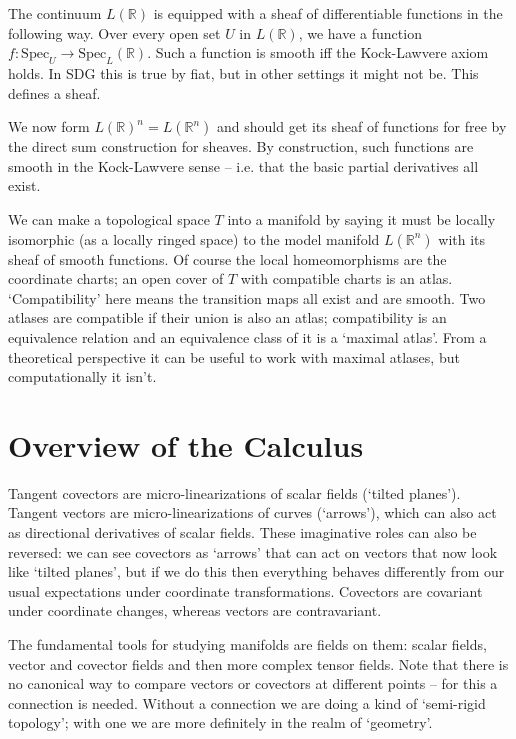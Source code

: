 \documentclass[oneside,english]{amsbook}
\numberwithin{section}{chapter}
\theoremstyle{plain}
\theoremstyle{definition}
\begin{document}
The continuum $L(\mathbb{R})$ is equipped with a sheaf of differentiable functions in the following way. Over every open set $U$ in $L(\mathbb{R})$, we have a function $f:\text{Spec}_U\to \text{Spec}_L(\mathbb{R})$. Such a function is smooth iff the Kock-Lawvere axiom holds. In SDG this is true by fiat, but in other settings it might not be. This defines a sheaf.

We now form $L(\mathbb{R})^n = L(\mathbb{R}^n)$ and should get its sheaf of functions for free by the direct sum construction for sheaves. By construction, such functions are smooth in the Kock-Lawvere sense -- i.e. that the basic partial derivatives all exist. 

We can make a topological space $T$ into a manifold by saying it must be locally isomorphic (as a locally ringed space) to the model manifold $L(\mathbb{R}^n)$ with its sheaf of smooth functions. Of course the local homeomorphisms are the coordinate charts; an open cover of $T$ with compatible charts is an atlas. `Compatibility' here means the transition maps all exist and are smooth. Two atlases are compatible if their union is also an atlas; compatibility is an equivalence relation and an equivalence class of it is a `maximal atlas'. From a theoretical perspective it can be useful to work with maximal atlases, but computationally it isn't.

\section{Overview of the Calculus}

Tangent covectors are micro-linearizations of scalar fields (`tilted planes'). Tangent vectors are micro-linearizations of curves (`arrows'), which can also act as directional derivatives of scalar fields. These imaginative roles can also be reversed: we can see covectors as `arrows' that can act on vectors that now look like `tilted planes', but if we do this then everything behaves differently from our usual expectations under coordinate transformations. Covectors are covariant under coordinate changes, whereas vectors are contravariant.

The fundamental tools for studying manifolds are fields on them: scalar fields, vector and covector fields and then more complex tensor fields. Note that there is no canonical way to compare vectors or covectors at different points -- for this a connection is needed. Without a connection we are doing a kind of `semi-rigid topology'; with one we are more definitely in the realm of `geometry'. 
\end{document}
